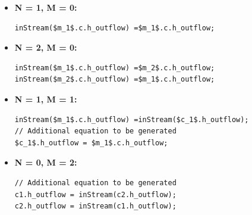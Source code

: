 \documentclass[10pt,a4paper]{report}
\renewcommand{\newline}{\hspace*{\fill}\raggedright\linebreak}
\renewcommand{\newline}{\hspace*{\fill}\linebreak}
\begin{document}
\begin{itemize}
\raggedright
\item \textbf{N = 1, M = 0:}\newline
\begin{lstlisting}[language=modelica,mathescape=true]
inStream($m_1$.c.h_outflow) =$m_1$.c.h_outflow;
\end{lstlisting}
\item
\textbf{N = 2, M = 0:}\newline
\begin{lstlisting}[language=modelica,mathescape=true]
inStream($m_1$.c.h_outflow) =$m_2$.c.h_outflow;
inStream($m_2$.c.h_outflow) =$m_1$.c.h_outflow;
\end{lstlisting}
\item \textbf{N = 1, M = 1:}\newline
\begin{lstlisting}[language=modelica,mathescape=true]
inStream($m_1$.c.h_outflow) =inStream($c_1$.h_outflow);
// Additional equation to be generated
$c_1$.h_outflow = $m_1$.c.h_outflow;
\end{lstlisting}
\item \textbf{N = 0, M = 2:}\newline
\begin{lstlisting}[language=modelica,mathescape=true]
// Additional equation to be generated
c1.h_outflow = inStream(c2.h_outflow);
c2.h_outflow = inStream(c1.h_outflow);
\end{lstlisting}


\end{itemize}
\end{document}
